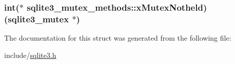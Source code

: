 \hypertarget{structsqlite3__mutex__methods_7bc1edfd01c67c6dcee26299bc31a7bf}{
\subsubsection[xMutexNotheld]{\setlength{\rightskip}{0pt plus 5cm}int($\ast$ {\bf sqlite3\_\-mutex\_\-methods::xMutexNotheld})({\bf sqlite3\_\-mutex} $\ast$)}}
\label{structsqlite3__mutex__methods_7bc1edfd01c67c6dcee26299bc31a7bf}




The documentation for this struct was generated from the following file:\begin{CompactItemize}
\item 
include/\hyperlink{sqlite3_8h}{sqlite3.h}\end{CompactItemize}
